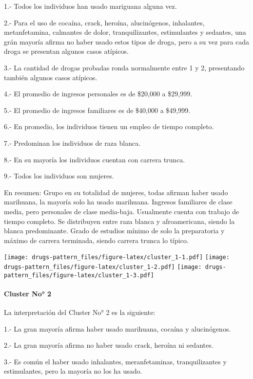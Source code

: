 \documentclass[]{article}
\let\oldparagraph\paragraph
\renewcommand{\paragraph}[1]{\oldparagraph{#1}\mbox{}}
\begin{document}
1.- Todos los individuos han usado mariguana alguna vez.

2.- Para el uso de cocaína, crack, heroína, alucinógenos, inhalantes,
metanfetamina, calmantes de dolor, tranquilizantes, estimulantes y
sedantes, una grán mayoría afirma no haber usado estos tipos de droga,
pero a su vez para cada droga se presentan algunos casos atípicos.

3.- La cantidad de drogas probadas ronda normalmente entre 1 y 2,
presentando también algunos casos atípicos.

4.- El promedio de ingresos personales es de \$20,000 a \$29,999.

5.- El promedio de ingresos familiares es de \$40,000 a \$49,999.

6.- En promedio, los individuos tienen un empleo de tiempo completo.

7.- Predominan los individuos de raza blanca.

8.- En su mayoría los individuos cuentan con carrera trunca.

9.- Todos los individuos son mujeres.

En resumen: Grupo en su totalidad de mujeres, todas afirman haber usado
marihuana, la mayoría solo ha usado marihuana. Ingresos familiares de
clase media, pero personales de clase media-baja. Usualmente cuenta con
trabajo de tiempo completo. Se distribuyen entre raza blanca y
afroamericana, siendo la blanca predominante. Grado de estudios mínimo
de solo la preparatoria y máximo de carrera terminada, siendo carrera
trunca lo típico.

\texttt{[image: drugs-pattern\_files/figure-latex/cluster\_1-1.pdf]}
\texttt{[image: drugs-pattern\_files/figure-latex/cluster\_1-2.pdf]}
\texttt{[image: drugs-pattern\_files/figure-latex/cluster\_1-3.pdf]}

\paragraph{Cluster No° 2}\label{cluster-no-2}

La interpretación del Cluster No° 2 es la siguiente:

1.- La gran mayoría afirma haber usado marihuana, cocaína y
alucinógenos.

2.- La gran mayoría afirma no haber usado crack, heroína ni sedantes.

3.- Es común el haber usado inhalantes, meranfetaminas, tranquilizantes
y estimulantes, pero la mayoría no los ha usado.
\end{document}

